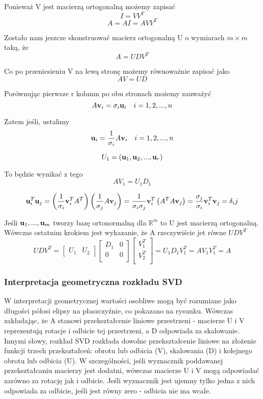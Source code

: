 \documentclass[12pt]{article}
\begin{document}
Ponieważ V jest macierzą ortogonalną możemy zapisać
\[I = VV^T \]
\[A = AI = AVV^T \]

Zostało nam jeszcze skonstruować macierz ortogonalną U o wymiarach $m \times m$ taką, że
\[A = UDV^T \]

Co po przeniesieniu V na lewą stronę możemy równoważnie zapisać jako
\[AV = UD \]

Porównując pierwsze r kolumn po obu stronach możemy zauważyć
\[A \vb{v}_i = \sigma_i \vb{u}_i \quad i = 1, 2,..., n \]

Zatem jeśli, ustalimy 
\[\vb{u}_i = \frac{1}{\sigma_i}A \vb{v}_i \quad i = 1, 2,..., n \]

\[U_1 = (\vb{u}_1, \vb{u}_2,..., \vb{u}_r) \]

To będzie wynikać z tego
\[AV_1 = U_1 D_1 \]

\[\vb{u}_i^T \vb{u}_j = \left(\frac{1}{\sigma_i}\vb{v}_i^T A^T \right) \left(\frac{1}{\sigma_j}A \vb{v}_j \right)
= \frac{1}{\sigma_i \sigma_j}\vb{v}_i^T \left( A^T A \vb{v}_j \right)
= \frac{\sigma_j}{\sigma_i} \vb{v}_i^T \vb{v}_j 
= \delta_ij \]

Jeśli $\vb{u}_1,..., \vb{u}_m$ tworzy bazę ortonormalną dla $\mathbb{R}^m$ to U jest macierzą ortogonalną. Wówczas ostatnim krokiem jest wykazanie, że A rzeczywiście jet równe $UDV^T$
\[UDV^T = \begin{bmatrix}
U_1 & U_2
\end{bmatrix}
\begin{bmatrix}
D_1 & 0 \\
0 & 0 \\
\end{bmatrix}
\begin{bmatrix}
V_1^T \\
V_2^T \\
\end{bmatrix}
= U_1 D_1 V_1^T = AV_1 V_1^T = A \]

\subsubsection*{Interpretacja geometryczna rozkładu SVD}
W interpretacji geometrycznej wartości osobliwe mogą być rozumiane jako długości półosi elipsy na płaszczyźnie, co pokazano na rysunku. Wówczas zakładając, że A stanowi przekształcenie liniowe przestrzeni - macierze U i V reprezentują rotacje i odbicie tej przestrzeni, a D odpowiada za skalowanie. Innymi słowy, rozkład SVD rozkłada dowolne przekształcenie liniowe na złożenie funkcji trzech przekształceń: obrotu lub odbicia (V), skalowania (D) i kolejnego obrotu lub odbicia (U). W szczególności, jeśli wyznacznik poddawanej przekształcaniu macierzy jest dodatni, wówczas macierze U i V mogą odpowiadać zarówno za rotację jak i odbicie. Jeśli wyznacznik jest ujemny tylko jedna z nich odpowiada za odbicie, jeśli jest równy zero - odbicia nie ma wcale.
\end{document}
